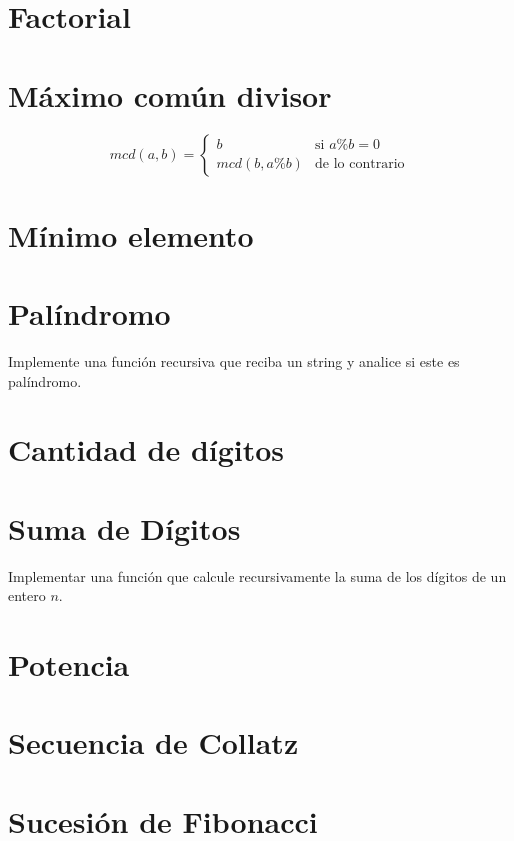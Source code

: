 \section{Factorial}


\section{Máximo común divisor}


\[ mcd(a, b) = \begin{cases}
b & \text{si } a \% b = 0 \\
mcd(b, a \% b) & \text{de lo contrario}
\end{cases} \]

\section{Mínimo elemento}


\section{Palíndromo}
Implemente una función recursiva que reciba un string y analice si este es palíndromo.

\section{Cantidad de dígitos}


\section{Suma de Dígitos}
Implementar una función que calcule recursivamente la suma de los dígitos de un entero \( n \).

\section{Potencia}


\section{Secuencia de Collatz}


\section{Sucesión de Fibonacci}


